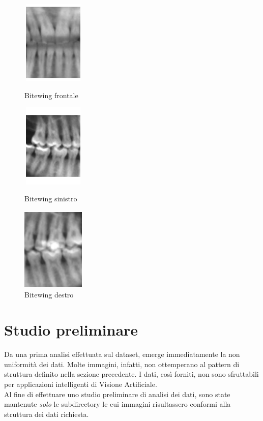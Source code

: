 \documentclass[12pt,a4paper,openright,twoside]{book}
\begin{document}
\begin{figure}[H]
    \centering
    \begin{minipage}{0.3\textwidth}
	\centering
    	\includegraphics[height=4cm,width=3cm]{figures/FRONTAL.pdf}
    	\caption{Bitewing frontale}
    	\label{lab:Bitewing frontale}
    \end{minipage}\hfill
    \begin{minipage}{0.3\textwidth}
    	\centering
    	\includegraphics[height=4cm,width=3cm]{figures/BTWSX.pdf}
    	\caption{Bitewing sinistro}
    	\label{lab:Bitewing sinistro}
    \end{minipage}\hfill
    \begin{minipage}{0.3\textwidth}
    	\centering
    	\includegraphics[height=4cm,width=3cm]{figures/BTWDX.pdf}
    	\caption{Bitewing destro}
   	\label{lab:Bitewing destro}
    \end{minipage}
\end{figure}

\section{Studio preliminare}
Da una prima analisi effettuata sul dataset, emerge immediatamente la non uniformità dei dati. Molte immagini, infatti, non ottemperano al pattern di struttura definito nella sezione precedente. I dati, così forniti, non sono sfruttabili per applicazioni intelligenti di Visione Artificiale.\\
Al fine di effettuare uno studio preliminare di analisi dei dati, sono state mantenute {\itshape solo} le subdirectory le cui immagini risultassero conformi alla struttura dei dati richiesta.\\
\end{document}
